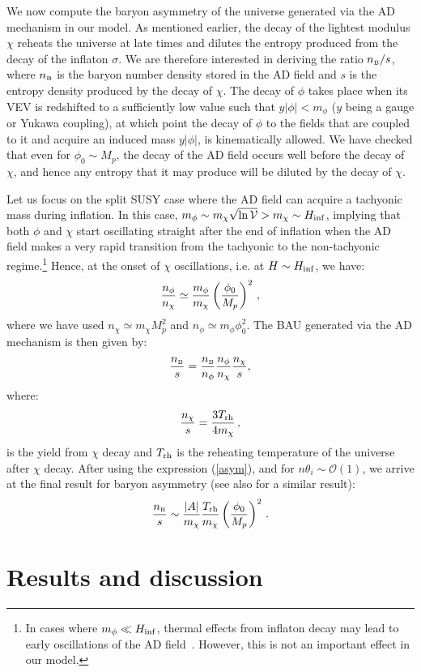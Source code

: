 \documentclass[11pt,a4paper]{article}
\newcommand{\be}{\begin{equation}}
\newcommand{\ee}{\end{equation}}
\def\B{{\scriptscriptstyle \rm B}}
\newcommand\vo{{\mathcal{V}}}
\newcommand{\mc}{\mathcal}
\begin{document}
We now compute the baryon asymmetry of the universe generated via the AD mechanism in our model. As mentioned earlier, the decay of the lightest modulus $\chi$ reheats the universe at late times and dilutes the entropy produced from the decay of the inflaton $\sigma$. We are therefore interested in deriving the ratio $n_\B/s$, where $n_\B$ is the baryon number density stored in the AD field and $s$ is the entropy density produced by the decay of $\chi$. The decay of $\phi$ takes place when its VEV is redshifted to a sufficiently low value such that $y |\phi| < m_\phi$ ($y$ being a gauge or Yukawa coupling), at which point the decay of $\phi$ to the fields that are coupled to it and acquire an induced mass $y |\phi|$, is kinematically allowed. We have checked that even for $\phi_0 \sim M_p$, the decay of the AD field occurs well before the decay of $\chi$, and hence any entropy that it may produce will be diluted by the decay of $\chi$. 

Let us focus on the split SUSY case where the AD field can acquire a tachyonic mass during inflation. In this case, $m_\phi \sim m_\chi \sqrt{\ln\vo} > m_\chi\sim  H_{\rm inf}$, implying that both $\phi$ and $\chi$ start oscillating straight after the end of inflation when the AD field makes a very rapid transition from the tachyonic to the non-tachyonic regime.\footnote{In cases where $m_\phi \ll H_{\rm inf}$, thermal effects from inflaton decay may lead to early oscillations of the AD field~\cite{thermal}. However, this is not an important effect in our model.} Hence, at the onset of $\chi$ oscillations, i.e. at $H \sim H_{\rm inf}$, we have:          
\be \label{ratio2}
{n_\phi \over n_\chi} \simeq {m_\phi \over m_\chi} \left({\phi_0 \over M_p}\right)^2\,, 
\ee
where we have used $n_\chi \simeq m_\chi M^2_p$ and $n_\phi \simeq m_\phi \phi^2_0$. 
The BAU generated via the AD mechanism is then given by:
\be 
{n_\B \over s} =  {n_\B \over n_\phi} {n_\phi \over n_\chi} {n_\chi \over s} ,
\ee
where:
\be
{n_\chi \over s} = {3 T_{\rm rh} \over 4 m_\chi}\,,
\ee
is the yield from $\chi$ decay and $T_{\rm rh}$ is the reheating temperature of the universe after $\chi$ decay. After using the expression (\ref{asym}), and for $n \theta_i \sim \mc{O}(1)$, we arrive at the final result for baryon asymmetry (see also \cite{Kane:2011ih} for a similar result):
\be \label{bau1}
{n_\B \over s} \sim {|A| \over m_\chi} {T_{\rm rh} \over m_\chi} \left({\phi_0 \over M_p}\right)^2\,.
\ee

\section{Results and discussion}
\label{SecResults}
\end{document}
